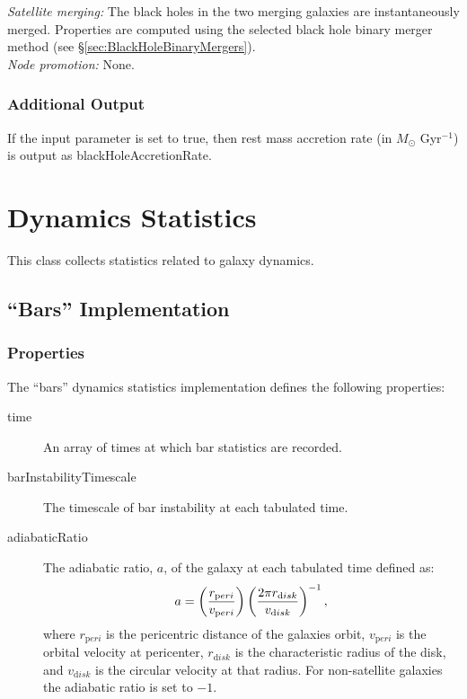 \noindent\emph{Satellite merging:} The black holes in the two merging galaxies are instantaneously merged. Properties are computed using the selected black hole binary merger method (see \S\ref{sec:BlackHoleBinaryMergers}).\\

\noindent\emph{Node promotion:} None.\\

\subsubsection{Additional Output}

If the {\normalfont \ttfamily [blackHoleOutputAccretion]} input parameter is set to true, then rest mass accretion rate (in $M_\odot$ Gyr$^{-1}$) is output as {\normalfont \ttfamily blackHoleAccretionRate}.

\section{Dynamics Statistics}

This class collects statistics related to galaxy dynamics.

\subsection{``Bars'' Implementation}

\subsubsection{Properties}

The ``bars'' dynamics statistics implementation defines the following properties:
\begin{description}
 \item [{\normalfont \ttfamily time}] An array of times at which bar statistics are recorded.
 \item [{\normalfont \ttfamily barInstabilityTimescale}] The timescale of bar instability at each tabulated time.
 \item [{\normalfont \ttfamily adiabaticRatio}] The adiabatic ratio, $a$, of the galaxy at each tabulated time defined as:
   \begin{equation}
     a = \left( {r_{\mathrm peri} \over v_{\mathrm peri}} \right) \left( {2 \pi r_{\mathrm disk} \over v_{\mathrm disk}} \right)^{-1},
   \end{equation}
   where $r_{\mathrm peri}$ is the pericentric distance of the galaxies orbit, $v_{\mathrm peri}$ is the orbital velocity at pericenter, $r_{\mathrm disk}$ is the characteristic radius of the disk, and $v_{\mathrm disk}$ is the circular velocity at that radius. For non-satellite galaxies the adiabatic ratio is set to $-1$.
\end{description}

